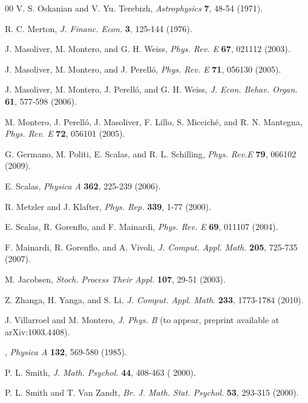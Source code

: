 \documentclass[english,aps,a4paper,twocolumn,showpacs,showkeys,amsfonts,amsmath,amssymb,amscd,nofootinbib]{revtex4}
\def\Journal#1#2#3#4#5#6{{#1}, {\it #4} \textbf{#5}, #6 (#2).}
\newcommand{\1}{\'\i}
\begin{document}
\begin{thebibliography}{00}
 \Journal{V. S. Oskanian and V. Yu. Terebizh}{1971}{}{Astrophysics}{7}{48-54}%

 \Journal{R. C. Merton}{1976}{}{J. Financ. Econ.}{3}{125-144}%


 \Journal{J. Masoliver, M. Montero, and G. H. Weiss}{2003}{}{Phys. Rev. E}{67}{021112}%

 \Journal{J. Masoliver, M. Montero, and J. Perell\'o}{2005}{}{Phys. Rev. E}{71}{056130}%

 \Journal{J. Masoliver, M. Montero, J.  Perell\'o, and G. H. Weiss}{2006}{}{J. Econ. Behav. Organ.}{61}{577-598}%

 \Journal{M. Montero,   J.  Perell\'o, J. Masoliver,  F. Lillo, S. Miccich\'{e}, and R. N. Mantegna}{2005}{}{Phys. Rev. E}{72}{056101}%

 \Journal{G. Germano, M. Politi, E. Scalas, and R. L. Schilling}{2009}{}{Phys. Rev.E}{79}{066102}%

 \Journal{E. Scalas}{2006}{}{Physica A}{362}{225-239}%

 \Journal{R. Metzler and J. Klafter}{2000}{}{Phys. Rep.}{339}{1-77}%

 \Journal{E. Scalas, R. Gorenflo, and  F. Mainardi}{2004}{}{Phys. Rev. E}{69}{011107}%

 \Journal{F. Mainardi, R. Gorenflo, and A. Vivoli}{2007}{}{J. Comput. Appl. Math.}{205}{725-735}%

 \Journal{M. Jacobsen}{2003}{Martingales and the distribution of the time to ruin}{Stoch. Process Their Appl.}{107}{29-51}

 \Journal{Z. Zhanga, H. Yanga, and S. Li}{2010}{}{J. Comput. Appl. Math.}{233}{1773-1784}%

J. Villarroel and M. Montero, {\it J. Phys. B} (to appear, preprint available at arXiv:1003.4408).  

\bibitem{Ba}\Journal{%
V. Balakrishnan}{1985}{}{Physica A}{132}{569-580}%

 \Journal{P. L. Smith}{%
2000}{}{J. Math. Psychol.}{44}{408-463}%

 \Journal{P. L. Smith and  T.  Van Zandt}{2000}{}{Br. J. Math. Stat. Psychol.}{53}{293-315}%


\end{thebibliography}
\end{document}
